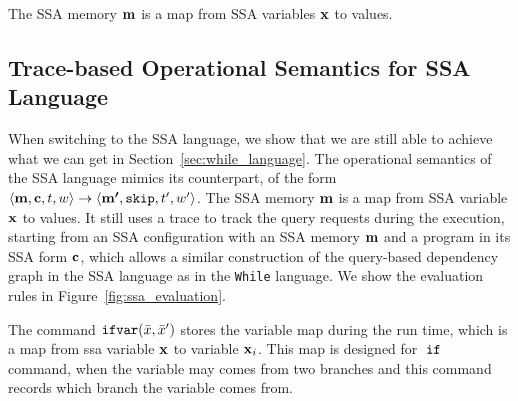 \documentclass[a4paper,11pt]{article}
\begin{document}
The SSA memory $\boldsymbol{\mathbf{m}}$ is a map from SSA variables $\boldsymbol{\mathbf{x}}$ to values.
%
%
{
\subsection{Trace-based Operational Semantics for SSA Language}
When switching to the SSA language, we show that we are still able to achieve what we can get in Section~\ref{sec:while_language}. 
The operational semantics of the SSA language mimics its counterpart, of the form $\langle \boldsymbol{\mathbf{m}}, \boldsymbol{\mathbf{c}}, t, w \rangle \to \langle \boldsymbol{\mathbf{m'}}, \mathtt{skip}, t', w' \rangle$. 
The SSA memory $\boldsymbol{\mathbf{m}}$ is a map from SSA variable $\boldsymbol{\mathbf{x}}$ to values.
It still uses a trace to track the query requests during the execution, starting from an SSA configuration with an SSA memory $\boldsymbol{\mathbf{m}}$ and a program in its SSA form $\boldsymbol{\mathbf{c}}$, 
which allows a similar construction of the query-based dependency graph in the SSA language as in the {\tt While} language.
We show the evaluation rules in Figure~\ref{fig:ssa_evaluation}.
}
%
The command 
$\mathsf{\mathtt{ifvar}}(\bar{x},\bar{x}')$ stores the variable map during the run time, which is a map from ssa variable $\boldsymbol{\mathbf{x}}$ to variable $\boldsymbol{\mathbf{x}}_i$. 
This map is designed for $\;\mathtt{if}\;$ command, when the variable may comes from two branches and this command records which branch the variable comes from. 
%
\end{document}
